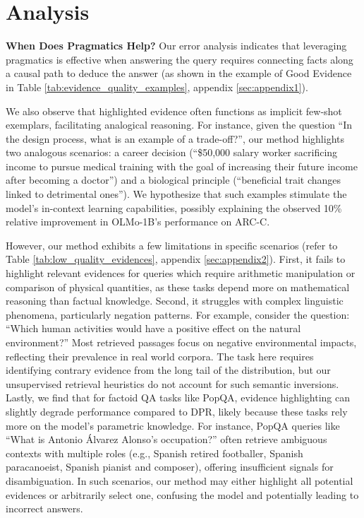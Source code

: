 \section{Analysis}
\textbf{When Does Pragmatics Help?}
Our error analysis indicates that leveraging pragmatics is effective when answering the query requires connecting facts along a causal path to deduce the answer (as shown in the example of Good Evidence in Table \ref{tab:evidence_quality_examples}, appendix \ref{sec:appendix1}). 

We also observe that highlighted evidence often functions as implicit few-shot exemplars, facilitating analogical reasoning. For instance, given the question ``In the design process, what is an example of a trade-off?'', our method highlights two analogous scenarios: a career decision (``\$50,000 salary worker sacrificing income to pursue medical training with the goal of increasing their future income after becoming a doctor'') and a biological principle (``beneficial trait changes linked to detrimental ones''). We hypothesize that such examples stimulate the model's in-context learning capabilities, possibly explaining the observed 10\% relative improvement in OLMo-1B's performance on ARC-C.

However, our method exhibits a few limitations in specific scenarios (refer to Table \ref{tab:low_quality_evidences}, appendix \ref{sec:appendix2}). First, it fails to highlight relevant evidences for queries which require arithmetic manipulation or comparison of physical quantities, as these tasks depend more on mathematical reasoning than factual knowledge. Second, it struggles with complex linguistic phenomena, particularly negation patterns. For example, consider the question: ``Which human activities would have a positive effect on the natural environment?'' Most retrieved passages focus on negative environmental impacts, reflecting their prevalence in real world corpora. The task here requires identifying contrary evidence from the long tail of the distribution, but our unsupervised retrieval heuristics do not account for such semantic inversions. \\
Lastly, we find that for factoid QA tasks like PopQA, evidence highlighting can slightly degrade performance compared to DPR, likely because these tasks rely more on the model's parametric knowledge. For instance, PopQA queries like ``What is Antonio Álvarez Alonso's occupation?'' often retrieve ambiguous contexts with multiple roles (e.g., Spanish retired footballer, Spanish paracanoeist, Spanish pianist and composer), offering insufficient signals for disambiguation. In such scenarios, our method may either highlight all potential evidences or arbitrarily select one, confusing the model and potentially leading to incorrect answers.

